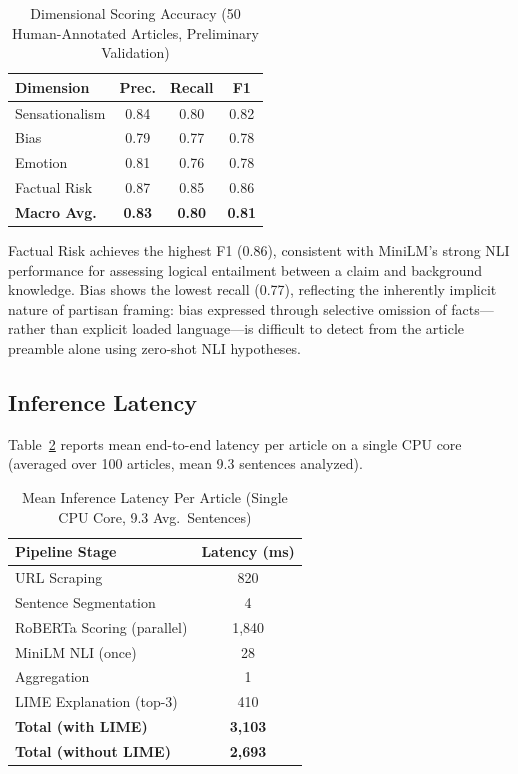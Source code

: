 \documentclass[journal]{IEEEtran}
\begin{document}
\begin{table}[htbp]
\caption{Dimensional Scoring Accuracy (50 Human-Annotated Articles, Preliminary Validation)}
\label{tab:dimensions}
\centering
\begin{tabular}{lccc}
\toprule
\textbf{Dimension} & \textbf{Prec.} & \textbf{Recall} & \textbf{F1} \\
\midrule
Sensationalism & 0.84 & 0.80 & 0.82 \\
Bias           & 0.79 & 0.77 & 0.78 \\
Emotion        & 0.81 & 0.76 & 0.78 \\
Factual Risk   & 0.87 & 0.85 & 0.86 \\
\midrule
\textbf{Macro Avg.} & \textbf{0.83} & \textbf{0.80} & \textbf{0.81} \\
\bottomrule
\end{tabular}
\end{table}

Factual Risk achieves the highest F1 (0.86), consistent with MiniLM's strong NLI performance
for assessing logical entailment between a claim and background knowledge. Bias shows the
lowest recall (0.77), reflecting the inherently implicit nature of partisan framing: bias
expressed through selective omission of facts—rather than explicit loaded language—is
difficult to detect from the article preamble alone using zero-shot NLI hypotheses.

\subsection{Inference Latency}

Table~\ref{tab:latency} reports mean end-to-end latency per article on a single CPU core
(averaged over 100 articles, mean 9.3 sentences analyzed).

\begin{table}[htbp]
\caption{Mean Inference Latency Per Article (Single CPU Core, 9.3 Avg.\ Sentences)}
\label{tab:latency}
\centering
\begin{tabular}{lc}
\toprule
\textbf{Pipeline Stage} & \textbf{Latency (ms)} \\
\midrule
URL Scraping             & 820 \\
Sentence Segmentation    & 4 \\
RoBERTa Scoring (parallel) & 1,840 \\
MiniLM NLI (once)        & 28 \\
Aggregation              & 1 \\
LIME Explanation (top-3) & 410 \\
\midrule
\textbf{Total (with LIME)}    & \textbf{3,103} \\
\textbf{Total (without LIME)} & \textbf{2,693} \\
\bottomrule
\end{tabular}
\end{table}
\end{document}
